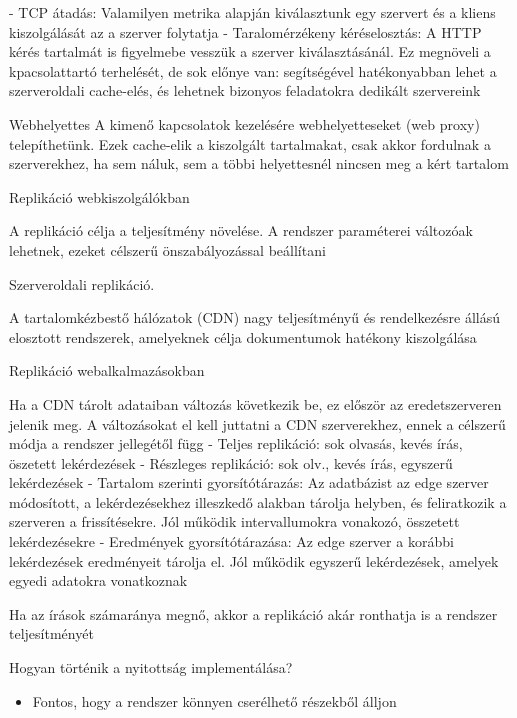 \documentclass[12pt]{article}
\begin{document}
\begin{description}
        - TCP átadás: Valamilyen metrika alapján kiválasztunk egy szervert és a kliens kiszolgálását az a szerver folytatja
        - Taralomérzékeny kéréselosztás: A HTTP kérés tartalmát is figyelmebe vesszük a szerver kiválasztásánál. Ez megnöveli
        a kpacsolattartó terhelését, de sok előnye van: segítségével hatékonyabban lehet a szerveroldali cache-elés, és lehetnek
        bizonyos feladatokra dedikált szervereink
    \item  Webhelyettes
        A kimenő kapcsolatok kezelésére webhelyetteseket (web proxy) telepíthetünk. Ezek cache-elik a kiszolgált tartalmakat,
        csak akkor fordulnak a szerverekhez, ha sem náluk, sem a többi helyettesnél nincsen meg a kért tartalom
    \item  Replikáció webkiszolgálókban
    \item A replikáció célja a teljesítmény növelése. A rendszer paraméterei változóak lehetnek, ezeket célszerű önszabályozással beállítani
    \item  Szerveroldali replikáció.
    \item A tartalomkézbestő hálózatok (CDN) nagy teljesítményű és rendelkezésre állású elosztott rendszerek, amelyeknek célja
        dokumentumok hatékony kiszolgálása
    \item  Replikáció webalkalmazásokban
    \item Ha a CDN tárolt adataiban változás következik be, ez először az eredetszerveren jelenik meg. A változásokat el kell juttatni
        a CDN szerverekhez, ennek a célszerű módja a rendszer jellegétől függ
        - Teljes replikáció: sok olvasás, kevés írás, öszetett lekérdezések
        - Részleges replikáció: sok olv., kevés írás, egyszerű lekérdezések
        - Tartalom szerinti gyorsítótárazás: Az adatbázist az edge szerver módosított, a lekérdezésekhez illeszkedő alakban
        tárolja helyben, és feliratkozik a szerveren a frissítésekre. Jól működik intervallumokra vonakozó, összetett lekérdezésekre
        - Eredmények gyorsítótárazása: Az edge szerver a korábbi lekérdezések eredményeit tárolja el. Jól működik egyszerű
        lekérdezések, amelyek egyedi adatokra vonatkoznak
    \item Ha az írások számaránya megnő, akkor a replikáció akár ronthatja is a rendszer teljesítményét 
        \color{clrNonExam}
    \item Hogyan történik a nyitottság implementálása?
        \begin{itemize}
            \item Fontos, hogy a rendszer könnyen cserélhető részekből álljon

\end{itemize}
\end{description}
\end{document}
